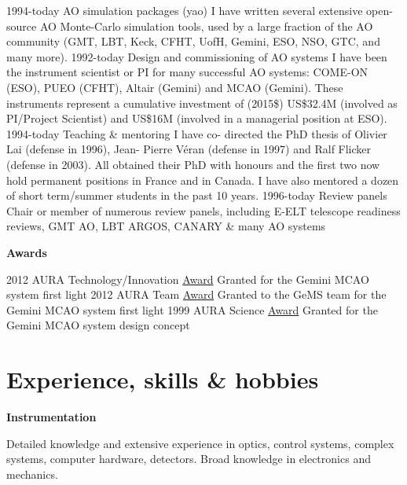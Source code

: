 \documentclass[]{friggeri-cv}
\begin{document}
  \begin{entrylist}
  \entry
    {1994-today}
    {AO simulation packages (yao)}
    {}
    {I have written several extensive open-source AO Monte-Carlo simulation tools, used by a large fraction of the AO community (GMT, LBT, Keck, CFHT, UofH, Gemini, ESO, NSO, GTC, and many more).}
  \entry
    {1992-today}
    {Design and commissioning of AO systems}
    {}
    {I have been the instrument scientist or PI for many successful AO systems: COME-ON (ESO), PUEO (CFHT), Altair (Gemini) and MCAO (Gemini). These instruments represent a cumulative investment of (2015\$) US\$32.4M (involved as PI/Project Scientist) and US\$16M (involved in a managerial position at ESO).}
  \entry
    {1994-today}
    {Teaching \& mentoring}
    {}
    {I have co- directed the PhD thesis of Olivier Lai (defense in 1996), Jean- Pierre V\'eran (defense in 1997) and Ralf Flicker (defense in 2003). All obtained their PhD with honours and the first two now hold permanent positions in France and in Canada. I have also mentored a dozen of short term/summer students in the past 10 years.}
  \entry
    {1996-today}
    {Review panels}
    {}
    {Chair or member of numerous review panels, including E-ELT telescope
    readiness reviews, GMT AO, LBT ARGOS, CANARY \& many AO systems}
\end{entrylist}

{\bf Awards}

\begin{entrylist}
  \entry
    {2012}
    {AURA Technology/Innovation \href{http://www.aura-astronomy.org/news/awards.asp}{Award}}
    {}
    {Granted for the Gemini MCAO system first light}
  \entry
    {2012}
    {AURA Team \href{http://www.aura-astronomy.org/news/awards.asp}{Award}}
    {}
    {Granted to the GeMS team for the Gemini MCAO system first light}
  \entry
    {1999}
    {AURA Science \href{http://www.aura-astronomy.org/news/awards.asp}{Award}}
    {}
    {Granted for the Gemini MCAO system design concept}
\end{entrylist}


\section{Experience, skills \& hobbies}

{\bf Instrumentation}

Detailed knowledge and extensive experience in optics, control systems, complex systems, computer hardware, detectors. Broad knowledge in electronics and mechanics.
\end{document}
